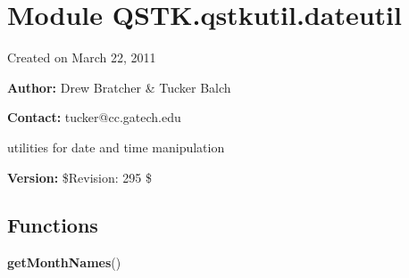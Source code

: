 %
%
%


\section{Module QSTK.qstkutil.dateutil}

    \label{QSTK:qstkutil:dateutil}
Created on March 22, 2011

\textbf{Author:} Drew Bratcher \& Tucker Balch



\textbf{Contact:} tucker@cc.gatech.edu

utilities for date and time manipulation



\textbf{Version:} \$Revision: 295 \$





  \subsection{Functions}

    \label{QSTK:qstkutil:dateutil:getMonthNames}

    \vspace{0.5ex}

\hspace{.8\funcindent}\begin{boxedminipage}{\funcwidth}

    \raggedright \textbf{getMonthNames}()

\setlength{\parskip}{2ex}
\setlength{\parskip}{1ex}
    \end{boxedminipage}

